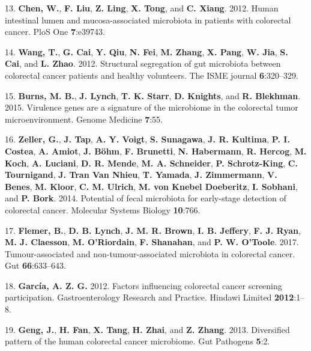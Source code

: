 \documentclass[12pt,]{article}
\begin{document}
\hypertarget{ref-chen_human_2012}{}
13. \textbf{Chen, W.}, \textbf{F. Liu}, \textbf{Z. Ling}, \textbf{X.
Tong}, and \textbf{C. Xiang}. 2012. Human intestinal lumen and
mucosa-associated microbiota in patients with colorectal cancer. PloS
One \textbf{7}:e39743.

\hypertarget{ref-wang_structural_2012}{}
14. \textbf{Wang, T.}, \textbf{G. Cai}, \textbf{Y. Qiu}, \textbf{N.
Fei}, \textbf{M. Zhang}, \textbf{X. Pang}, \textbf{W. Jia}, \textbf{S.
Cai}, and \textbf{L. Zhao}. 2012. Structural segregation of gut
microbiota between colorectal cancer patients and healthy volunteers.
The ISME journal \textbf{6}:320--329.

\hypertarget{ref-burns_virulence_2015}{}
15. \textbf{Burns, M. B.}, \textbf{J. Lynch}, \textbf{T. K. Starr},
\textbf{D. Knights}, and \textbf{R. Blekhman}. 2015. Virulence genes are
a signature of the microbiome in the colorectal tumor microenvironment.
Genome Medicine \textbf{7}:55.

\hypertarget{ref-zeller_potential_2014}{}
16. \textbf{Zeller, G.}, \textbf{J. Tap}, \textbf{A. Y. Voigt},
\textbf{S. Sunagawa}, \textbf{J. R. Kultima}, \textbf{P. I. Costea},
\textbf{A. Amiot}, \textbf{J. Böhm}, \textbf{F. Brunetti}, \textbf{N.
Habermann}, \textbf{R. Hercog}, \textbf{M. Koch}, \textbf{A. Luciani},
\textbf{D. R. Mende}, \textbf{M. A. Schneider}, \textbf{P.
Schrotz-King}, \textbf{C. Tournigand}, \textbf{J. Tran Van Nhieu},
\textbf{T. Yamada}, \textbf{J. Zimmermann}, \textbf{V. Benes},
\textbf{M. Kloor}, \textbf{C. M. Ulrich}, \textbf{M. von Knebel
Doeberitz}, \textbf{I. Sobhani}, and \textbf{P. Bork}. 2014. Potential
of fecal microbiota for early-stage detection of colorectal cancer.
Molecular Systems Biology \textbf{10}:766.

\hypertarget{ref-flemer_tumour-associated_2017}{}
17. \textbf{Flemer, B.}, \textbf{D. B. Lynch}, \textbf{J. M. R. Brown},
\textbf{I. B. Jeffery}, \textbf{F. J. Ryan}, \textbf{M. J. Claesson},
\textbf{M. O'Riordain}, \textbf{F. Shanahan}, and \textbf{P. W.
O'Toole}. 2017. Tumour-associated and non-tumour-associated microbiota
in colorectal cancer. Gut \textbf{66}:633--643.

\hypertarget{ref-GimenoGarca2012}{}
18. \textbf{García, A. Z. G.} 2012. Factors influencing colorectal
cancer screening participation. Gastroenterology Research and Practice.
Hindawi Limited \textbf{2012}:1--8.

\hypertarget{ref-geng_diversified_2013}{}
19. \textbf{Geng, J.}, \textbf{H. Fan}, \textbf{X. Tang}, \textbf{H.
Zhai}, and \textbf{Z. Zhang}. 2013. Diversified pattern of the human
colorectal cancer microbiome. Gut Pathogens \textbf{5}:2.
\end{document}
